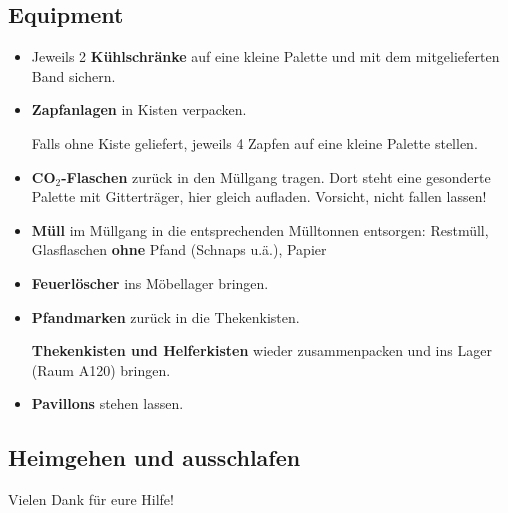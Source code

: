\subsection{Equipment}
\begin{itemize}
  \item Jeweils 2 \textbf{Kühlschränke} auf eine kleine Palette und mit dem mitgelieferten Band sichern.
  \item \textbf{Zapfanlagen} in Kisten verpacken.
    
    Falls ohne Kiste geliefert, jeweils 4 Zapfen auf eine kleine Palette stellen.
  \item \textbf{CO$_2$-Flaschen} zurück in den Müllgang tragen. Dort steht eine gesonderte Palette mit Gitterträger, hier gleich aufladen. Vorsicht, nicht fallen lassen!
  \item \textbf{Müll} im Müllgang in die entsprechenden Mülltonnen entsorgen: Restmüll, Glasflaschen \textbf{ohne} Pfand (Schnaps u.ä.), Papier
  \item \textbf{Feuerlöscher} ins Möbellager bringen.
  \item \textbf{Pfandmarken} zurück in die Thekenkisten.
    
    \textbf{Thekenkisten und Helferkisten} wieder zusammenpacken und ins Lager (Raum A120) bringen.
  \item \textbf{Pavillons} stehen lassen.
\end{itemize}
\subsection{Heimgehen und ausschlafen \smiley}
Vielen Dank für eure Hilfe!

